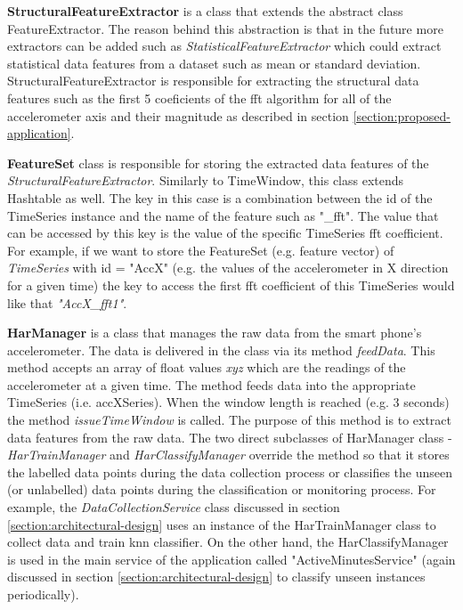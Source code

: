     \textbf{StructuralFeatureExtractor} is a class that extends the abstract class FeatureExtractor. The reason behind this abstraction is that in the future more extractors can be added such as \textit{StatisticalFeatureExtractor} which could extract statistical data features from a dataset such as mean or standard deviation. StructuralFeatureExtractor is responsible for extracting the structural data features such as the first 5 coeficients of the \gls{fft} algorithm for all of the accelerometer axis and their magnitude as described in section \ref{section:proposed-application}.
    
    \textbf{FeatureSet} class is responsible for storing the extracted data features of the \textit{StructuralFeatureExtractor}. Similarly to TimeWindow, this class extends Hashtable as well. The key in this case is a combination between the id of the TimeSeries instance and the name of the feature such as "\_fft". The value that can be accessed by this key is the value of the specific TimeSeries \gls{fft} coefficient. For example, if we want to store the FeatureSet (e.g. feature vector) of \textit{TimeSeries} with id = "AccX" (e.g. the values of the accelerometer in X direction for a given time) the key to access the first \gls{fft} coefficient of this TimeSeries would like that \textit{"AccX\_fft1"}.
    
    \textbf{HarManager} is a class that manages the raw data from the smart phone's accelerometer. The data is delivered in the class via its method \textit{feedData}. This method accepts an array of float values \textit{xyz} which are the readings of the accelerometer at a given time. The method feeds data into the appropriate TimeSeries (i.e. accXSeries). When the window length is reached (e.g. 3 seconds) the method \textit{issueTimeWindow} is called. The purpose of this method is to extract data features from the raw data. The two direct subclasses of HarManager class - \textit{HarTrainManager} and \textit{HarClassifyManager} override the method so that it stores the labelled data points during the data collection process or classifies the unseen (or unlabelled) data points during the classification or monitoring process. For example, the \textit{DataCollectionService} class discussed in section \ref{section:architectural-design} uses an instance of the HarTrainManager class to collect data and train \gls{knn} classifier. On the other hand, the HarClassifyManager is used in the main service of the application called "ActiveMinutesService" (again discussed in section \ref{section:architectural-design} to classify unseen instances periodically). 
        
